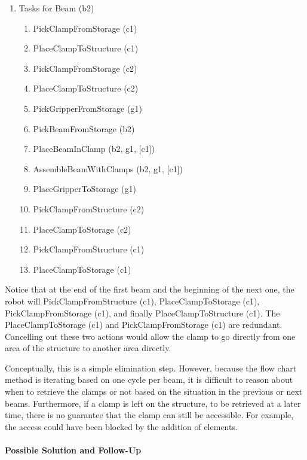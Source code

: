\begin{enumerate}[nosep]
	\item {\footnotesize Tasks for Beam (b2) }
    \begin{enumerate}
        \item {\footnotesize PickClampFromStorage (c1)}
        \item {\footnotesize PlaceClampToStructure (c1)}
        \item {\footnotesize PickClampFromStorage (c2)}
        \item {\footnotesize PlaceClampToStructure (c2)}
        \item {\footnotesize PickGripperFromStorage (g1)}
        \item {\footnotesize PickBeamFromStorage (b2)}
        \item {\footnotesize PlaceBeamInClamp (b2, g1, [c1])}
        \item {\footnotesize AssembleBeamWithClamps (b2, g1, [c1])}
        \item {\footnotesize PlaceGripperToStorage (g1)}
        \item {\footnotesize PickClampFromStructure (c2)}
        \item {\footnotesize PlaceClampToStorage (c2)}
        \item {\footnotesize PickClampFromStructure (c1)}
        \item {\footnotesize PlaceClampToStorage (c1)}
    \end{enumerate}

\end{enumerate}

Notice that at the end of the first beam and the beginning of the next one, the robot will PickClampFromStructure (c1), PlaceClampToStorage (c1), PickClampFromStorage (c1), and finally PlaceClampToStructure (c1). The PlaceClampToStorage (c1) and PickClampFromStorage (c1) are redundant. Cancelling out these two actions would allow the clamp to go directly from one area of the structure to another area directly.

Conceptually, this is a simple elimination step. However, because the flow chart method is iterating based on one cycle per beam, it is difficult to reason about when to retrieve the clamps or not based on the situation in the previous or next beams. Furthermore, if a clamp is left on the structure, to be retrieved at a later time, there is no guarantee that the clamp can still be accessible. For example, the access could have been blocked by the addition of elements. 

\paragraph{Possible Solution and Follow-Up}

